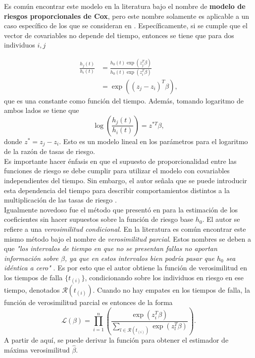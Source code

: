 \documentclass[11pt,a4paper]{article}
\begin{document}
Es común encontrar este modelo en la literatura bajo el nombre de \textbf{modelo de riesgos proporcionales de Cox}, pero este nombre solamente es aplicable a un caso específico de los que se consideran en \citet{cox}. Específicamente, si se cumple que el vector de covariables no depende del tiempo, entonces se tiene que para dos individuos $i, j$

\begin{align}
\label{eq:prop_haz}
\frac{h_j(t)}{h_i(t)} &= \frac{h_0(t)\exp (z_j^T \beta)}{h_0(t)\exp (z_i^T \beta)} \nonumber \\
&= \exp ((z_j-z_i)^T \beta),
\end{align}
que es una constante como función del tiempo. Además, tomando logaritmo de ambos lados se tiene que
$$\log \left(\frac{h_j(t)}{h_i(t)}\right) = z^{*T} \beta,$$ donde $z^* = z_j-z_i$. Esto es un modelo lineal en los parámetros para el logaritmo de la razón de tasas de riesgo.\\

Es importante hacer énfasis en que el supuesto de proporcionalidad entre las funciones de riesgo se debe cumplir para utilizar el modelo con covariables independientes del tiempo. Sin embargo, el autor señala que se puede introducir esta dependencia del tiempo para describir comportamientos distintos a la multiplicación de las tasas de riesgo \citep{cox}.\\

Igualmente novedoso fue el método que presentó en \citet{cox} para la estimación de los coeficientes sin hacer supuestos sobre la función de riesgo base $h_0$. El autor se refiere a una \textit{verosimilitud condicional}. En la literatura es común encontrar este mismo método bajo el nombre de \textit{verosimilitud parcial}. Estos nombres se deben a que \textit{"los intervalos de tiempo en que no se presentan fallas no aportan información sobre $\beta$, ya que en estos intervalos bien podría pasar que $h_0$ sea idéntica a cero"} \citep{cox}. Es por esto que el autor obtiene la función de verosimilitud en los tiempos de falla $\lbrace t_{(i)} \rbrace$, condicionando sobre los individuos en riesgo en ese tiempo, denotados $\mathcal{R}(t_{(i)})$. Cuando no hay empates en los tiempos de falla, la función de verosimilitud parcial es entonces de la forma
$$\mathcal{L}(\beta) = \prod_{i=1}^n \left(\frac{\exp (z_i^T \beta)}{\sum_{l\in \mathcal{R}(t_{(i)})}\exp (z_l^T \beta)}\right).$$ A partir de aquí, se puede derivar la función para obtener el estimador de máxima verosimilitud $\hat{\beta}$.\\
\end{document}
